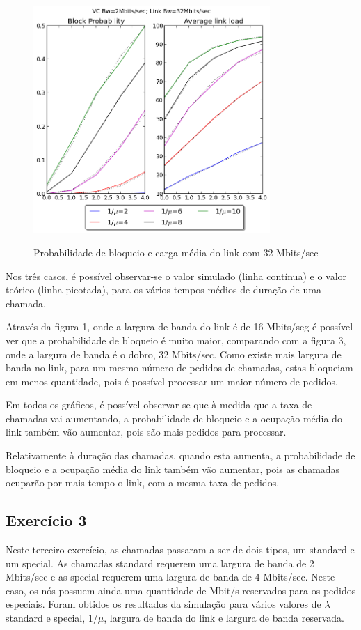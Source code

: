 \documentclass[pdftex,12pt,a4paper]{report}
\begin{document}
\begin{figure}[!htb]
\center
 \includegraphics[width=90mm,scale=1]{imagensGuia/graph3ex1.png}
 \label{fig:graph3ex1}
 \caption{Probabilidade de bloqueio e carga média do link com 32 Mbits/sec} 
\end{figure}

Nos três casos, é possível observar-se o valor simulado (linha contínua) e o valor teórico (linha picotada), para os vários tempos médios de duração de uma chamada.

Através da figura 1, onde a largura de banda do link é de 16 Mbits/seg é possível ver que a probabilidade de bloqueio é muito maior, comparando com a figura 3, onde a largura de banda é o dobro, 32 Mbits/sec. Como existe mais largura de banda no link, para um mesmo número de pedidos de chamadas, estas bloqueiam em menos quantidade, pois é possível processar um maior número de pedidos. 

Em todos os gráficos, é possível observar-se que à medida que a taxa de chamadas vai aumentando, a probabilidade de bloqueio e a ocupação média do link também vão aumentar, pois são mais pedidos para processar.

Relativamente à duração das chamadas, quando esta aumenta, a probabilidade de bloqueio e a ocupação média do link também vão aumentar, pois as chamadas ocuparão por mais tempo o link, com a mesma taxa de pedidos.

\newpage
\subsection{Exercício 3}

Neste terceiro exercício, as chamadas passaram a ser de dois tipos, um standard e um special. As chamadas standard requerem uma largura de banda de 2 Mbits/sec e as special requerem uma largura de banda de 4 Mbits/sec. Neste caso, os nós possuem ainda uma quantidade de Mbit/s reservados para os pedidos especiais. Foram obtidos os resultados da simulação para vários valores de $\lambda$ standard e special, 1/$\mu$, largura de banda do link e largura de banda reservada.
\end{document}
